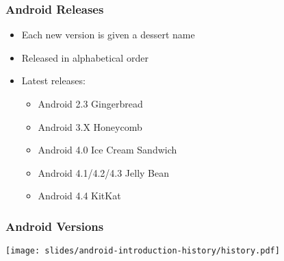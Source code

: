 \begin{frame}
  \frametitle{Android Releases}
  \begin{itemize}
  \item Each new version is given a dessert name
  \item Released in alphabetical order
  \item Latest releases:
    \begin{itemize}
    \item Android 2.3 Gingerbread
    \item Android 3.X Honeycomb
    \item Android 4.0 Ice Cream Sandwich
    \item Android 4.1/4.2/4.3 Jelly Bean
    \item Android 4.4 KitKat
    \end{itemize}
  \end{itemize}
\end{frame}

\begin{frame}
  \frametitle{Android Versions}
  \begin{center}
    \texttt{[image: slides/android-introduction-history/history.pdf]}
  \end{center}
\end{frame}
